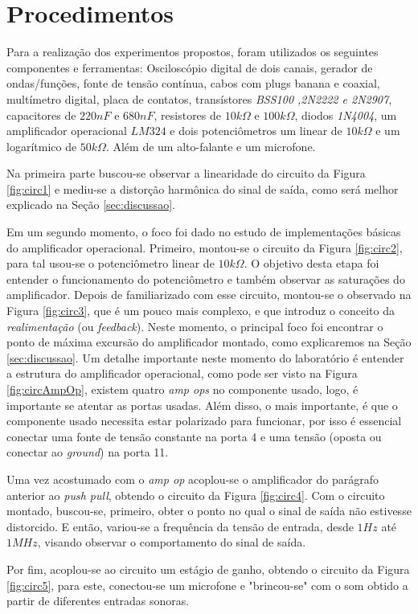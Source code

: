  \section{Procedimentos} \label{sec:procedimentos}
    Para a realização dos experimentos propostos, foram utilizados os seguintes componentes e ferramentas: Osciloscópio digital de dois canais, gerador de ondas/funções, fonte de tensão contínua, cabos com plugs banana e coaxial, multímetro digital, placa de contatos, transístores \emph{BSS100 ,2N2222 e 2N2907}, capacitores de $220nF$ e $680nF$, resistores de $10 k\Omega$ e $100 k\Omega$, diodos \emph{1N4004}, um amplificador operacional $LM324$ e dois potenciômetros um linear de $10 k\Omega$ e um logarítmico de $50 k\Omega$. Além de um alto-falante e um microfone.
    
    Na primeira parte buscou-se observar a linearidade do circuito da Figura \ref{fig:circ1} e mediu-se a distorção harmônica do sinal de saída, como será melhor explicado na Seção \ref{sec:discussao}.
    
    Em um segundo momento, o foco foi dado no estudo de implementações básicas do amplificador operacional. Primeiro, montou-se o circuito da Figura \ref{fig:circ2}, para tal usou-se o potenciômetro linear de $10k\Omega$. O objetivo desta etapa foi entender o funcionamento do potenciômetro e também observar as saturações do amplificador. Depois de familiarizado com esse circuito, montou-se o observado na Figura \ref{fig:circ3}, que é um pouco mais complexo, e que introduz o conceito da \emph{realimentação} (ou \emph{feedback}). Neste momento, o principal foco foi encontrar o ponto de máxima excursão do amplificador montado, como explicaremos na Seção \ref{sec:discussao}. Um detalhe importante neste momento do laboratório é entender a estrutura do amplificador operacional, como pode ser visto na Figura \ref{fig:circAmpOp}, existem quatro \emph{amp ops} no componente usado, logo, é importante se atentar as portas usadas. Além disso, o mais importante, é que o componente usado necessita estar polarizado para funcionar, por isso é essencial conectar uma fonte de tensão constante na porta 4 e uma tensão (oposta ou conectar ao \emph{ground}) na porta 11.
    
    Uma vez acostumado com o \emph{amp op} acoplou-se o amplificador do parágrafo anterior ao \emph{push pull}, obtendo o circuito da Figura \ref{fig:circ4}. Com o circuito montado, buscou-se, primeiro, obter o ponto no qual o sinal de saída não estivesse distorcido. E então, variou-se a frequência da tensão de entrada, desde $1Hz$ até $1 MHz$, visando observar o comportamento do sinal de saída.
    
    Por fim, acoplou-se ao circuito um estágio de ganho, obtendo o circuito da Figura \ref{fig:circ5}, para este, conectou-se um microfone e "brincou-se" com o som obtido a partir de diferentes entradas sonoras.
    